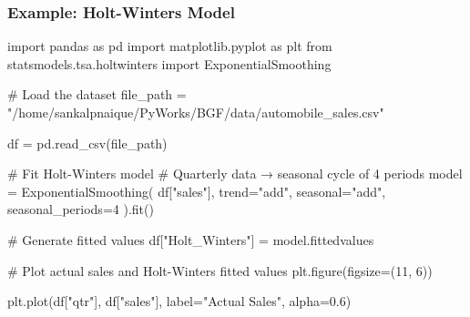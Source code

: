 \documentclass[
  a4paper,
]{article}
\newenvironment{Shaded}{\begin{snugshade}}{\end{snugshade}}
\newcommand{\CommentTok}[1]{\textcolor[rgb]{0.37,0.37,0.37}{#1}}
\newcommand{\DecValTok}[1]{\textcolor[rgb]{0.68,0.00,0.00}{#1}}
\newcommand{\FloatTok}[1]{\textcolor[rgb]{0.68,0.00,0.00}{#1}}
\newcommand{\ImportTok}[1]{\textcolor[rgb]{0.00,0.46,0.62}{#1}}
\newcommand{\NormalTok}[1]{\textcolor[rgb]{0.00,0.23,0.31}{#1}}
\newcommand{\OperatorTok}[1]{\textcolor[rgb]{0.37,0.37,0.37}{#1}}
\newcommand{\StringTok}[1]{\textcolor[rgb]{0.13,0.47,0.30}{#1}}
\begin{document}
\subsubsection{Example: Holt-Winters
Model}\label{example-holt-winters-model}

\begin{tcolorbox}[enhanced jigsaw, arc=.35mm, bottomrule=.15mm, bottomtitle=1mm, breakable, colback=white, colbacktitle=quarto-callout-tip-color!10!white, colframe=quarto-callout-tip-color-frame, coltitle=black, left=2mm, leftrule=.75mm, opacityback=0, opacitybacktitle=0.6, rightrule=.15mm, title=\textcolor{quarto-callout-tip-color}{\faLightbulb}\hspace{0.5em}{💻 Coding Session}, titlerule=0mm, toprule=.15mm, toptitle=1mm]

\begin{Shaded}
\begin{Highlighting}[]
\ImportTok{import}\NormalTok{ pandas }\ImportTok{as}\NormalTok{ pd}
\ImportTok{import}\NormalTok{ matplotlib.pyplot }\ImportTok{as}\NormalTok{ plt}
\ImportTok{from}\NormalTok{ statsmodels.tsa.holtwinters }\ImportTok{import}\NormalTok{ ExponentialSmoothing}

\CommentTok{\# Load the dataset}
\NormalTok{file\_path }\OperatorTok{=} \StringTok{"/home/sankalpnaique/PyWorks/BGF/data/automobile\_sales.csv"}

\NormalTok{df }\OperatorTok{=}\NormalTok{ pd.read\_csv(file\_path)}

\CommentTok{\# Fit Holt{-}Winters model}
\CommentTok{\# Quarterly data → seasonal cycle of 4 periods}
\NormalTok{model }\OperatorTok{=}\NormalTok{ ExponentialSmoothing(}
\NormalTok{    df[}\StringTok{"sales"}\NormalTok{], trend}\OperatorTok{=}\StringTok{"add"}\NormalTok{, seasonal}\OperatorTok{=}\StringTok{"add"}\NormalTok{, seasonal\_periods}\OperatorTok{=}\DecValTok{4}
\NormalTok{).fit()}

\CommentTok{\# Generate fitted values}
\NormalTok{df[}\StringTok{"Holt\_Winters"}\NormalTok{] }\OperatorTok{=}\NormalTok{ model.fittedvalues}

\CommentTok{\# Plot actual sales and Holt{-}Winters fitted values}
\NormalTok{plt.figure(figsize}\OperatorTok{=}\NormalTok{(}\DecValTok{11}\NormalTok{, }\DecValTok{6}\NormalTok{))}

\NormalTok{plt.plot(df[}\StringTok{"qtr"}\NormalTok{], df[}\StringTok{"sales"}\NormalTok{], label}\OperatorTok{=}\StringTok{"Actual Sales"}\NormalTok{, alpha}\OperatorTok{=}\FloatTok{0.6}\NormalTok{)}


\end{Highlighting}
\end{Shaded}
\end{tcolorbox}
\end{document}
